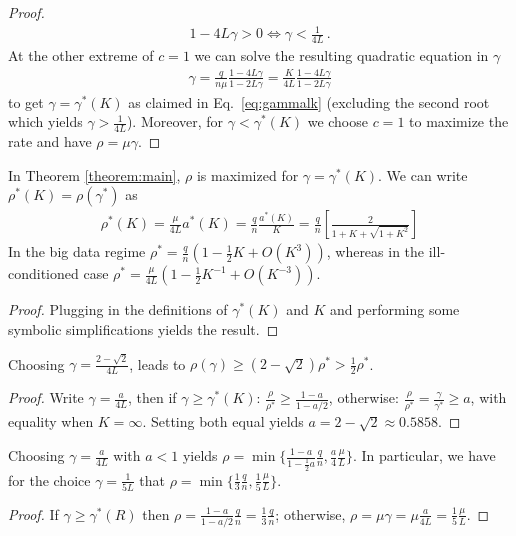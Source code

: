 \begin{theorem}
\begin{proof}
\begin{align}
1 - 4 L \gamma > 0  \iff \gamma < \frac {1}{4L} \,.
\end{align}
At the other extreme of $c=1$ we can solve the resulting quadratic equation in $\gamma$ 
\begin{align}
\gamma =  \frac{q}{n \mu}  \frac{1 - 4 L \gamma}{1 - 2L \gamma} = 
\frac{K}{4L} \frac{1 - 4 L \gamma}{1 - 2L \gamma} 
\end{align}
to get $\gamma= \gamma^*(K)$ as claimed in Eq.~\eqref{eq:gammalk} (excluding the second root which yields $\gamma > \frac{1}{4L}$). Moreover, for $\gamma < \gamma^*(K)$  we choose $c=1$ to maximize the rate and have $\rho = \mu \gamma$.
\end{proof}
\end{theorem}

%
%
%
%
%
%

\begin{corollary}
\label{corollary:opt-rho-appendix}
In Theorem \ref{theorem:main}, $\rho$ is maximized for $\gamma = \gamma^*(K)$. We can write $\rho^*(K) = \rho(\gamma^*)$ as 
\begin{align*}
\rho^*(K) = 
\frac \mu {4L} a^*(K) %
= \frac{q}{n}\frac{a^*(K)}{K} = \frac qn \left[ \frac{2}{1+K + \sqrt{1 + K^2} } \right]
\end{align*}
In the big data regime $\rho^* = \frac qn (1-\frac 12 K + O(K^3))$, whereas in the ill-conditioned case $\rho^* = \frac \mu{4L} (1 - \frac {1}{2}K^{-1} + O(K^{-3}))$.
\begin{proof}
Plugging in the definitions of $\gamma^*(K)$ and $K$ and performing some symbolic simplifications yields the result. 
\end{proof}
\end{corollary}



\begin{corollary}
\label{corollary:universal-appendix}
Choosing $\gamma = \frac{2 -\sqrt{2} }{4L}$, leads to $\rho(\gamma) \ge (2 - \sqrt{2}) \rho^* > \frac 12 \rho^*$.
\begin{proof} 
Write $\gamma = \frac{a}{4L}$, then if $\gamma \geq \gamma^*(K)$: $\frac{\rho}{\rho^*} \geq \frac{1 - a}{1- a/2}$, otherwise: $ \frac{\rho}{\rho^*} = \frac{\gamma}{\gamma^*} \ge  a$, with equality when $K = \infty$. Setting both equal yields $a =  2 - \sqrt{2} \approx 0.5858$. 
\end{proof} 
\end{corollary}

\begin{corollary}
Choosing $\gamma = \frac{a}{4L}$ with $ a<1$ yields $\rho = \min\{ \frac {1-a}{1 - \frac 12 a} \frac qn, \frac{a}{4} \frac \mu L \}$. In particular, we have for the choice $\gamma = \frac{1}{5L}$ that $\rho = \min\{ \frac {1}{3} \frac qn, \frac 15 \frac \mu L \}$.
\begin{proof} 
If $\gamma \ge \gamma^*(R)$ then $\rho = \frac{1-a}{1 -a/2}\frac qn = \frac{1}{3} \frac{q}{n}$; otherwise, $\rho = \mu \gamma = \mu \frac{a}{4L} = \frac{1}{5} \frac{\mu}{L}$.
\end{proof} 
\end{corollary}

